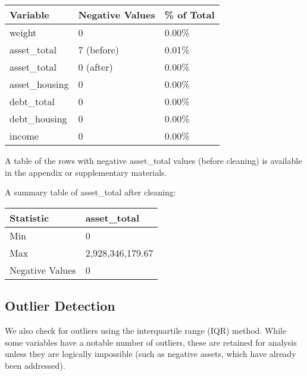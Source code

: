 \documentclass[
  letterpaper,
  DIV=11,
  numbers=noendperiod]{scrartcl}
\begin{document}
\begin{longtable}[]{@{}lll@{}}
\toprule\noalign{}
Variable & Negative Values & \% of Total \\
\midrule\noalign{}
\endhead
\bottomrule\noalign{}
\endlastfoot
weight & 0 & 0.00\% \\
asset\_total & 7 (before) & 0.01\% \\
asset\_total & 0 (after) & 0.00\% \\
asset\_housing & 0 & 0.00\% \\
debt\_total & 0 & 0.00\% \\
debt\_housing & 0 & 0.00\% \\
income & 0 & 0.00\% \\
\end{longtable}

A table of the rows with negative asset\_total values (before cleaning)
is available in the appendix or supplementary materials.

A summary table of asset\_total after cleaning:

\begin{longtable}[]{@{}ll@{}}
\toprule\noalign{}
Statistic & asset\_total \\
\midrule\noalign{}
\endhead
\bottomrule\noalign{}
\endlastfoot
Min & 0 \\
Max & 2,928,346,179.67 \\
Negative Values & 0 \\
\end{longtable}

\subsection{Outlier Detection}\label{outlier-detection}

We also check for outliers using the interquartile range (IQR) method.
While some variables have a notable number of outliers, these are
retained for analysis unless they are logically impossible (such as
negative assets, which have already been addressed).
\end{document}
